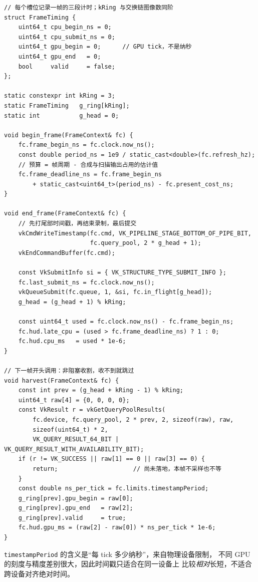 \documentclass[12pt,a4paper,fontset=fandol]{ctexbook}
\newcommand{\Tp}[1]{\texttt{#1}}
\newcommand{\Lang}[1]{\textsf{#1}}
\newcommand{\DomGPU}{\Lang{GPU}}
\begin{document}
\begin{lstlisting}[style=cppstyle,caption={主循环帧预算与 GPU 时间戳的非阻塞读回骨架},label={lst:ch01-frame-loop}]
// 每个槽位记录一帧的三段计时；kRing 与交换链图像数同阶
struct FrameTiming {
    uint64_t cpu_begin_ns = 0;
    uint64_t cpu_submit_ns = 0;
    uint64_t gpu_begin = 0;      // GPU tick，不是纳秒
    uint64_t gpu_end   = 0;
    bool     valid     = false;
};

static constexpr int kRing = 3;
static FrameTiming   g_ring[kRing];
static int           g_head = 0;

void begin_frame(FrameContext& fc) {
    fc.frame_begin_ns = fc.clock.now_ns();
    const double period_ns = 1e9 / static_cast<double>(fc.refresh_hz);
    // 预算 = 帧周期 - 合成与扫描输出占用的估计值
    fc.frame_deadline_ns = fc.frame_begin_ns
        + static_cast<uint64_t>(period_ns) - fc.present_cost_ns;
}

void end_frame(FrameContext& fc) {
    // 先打尾部时间戳，再结束录制，最后提交
    vkCmdWriteTimestamp(fc.cmd, VK_PIPELINE_STAGE_BOTTOM_OF_PIPE_BIT,
                        fc.query_pool, 2 * g_head + 1);
    vkEndCommandBuffer(fc.cmd);

    const VkSubmitInfo si = { VK_STRUCTURE_TYPE_SUBMIT_INFO };
    fc.last_submit_ns = fc.clock.now_ns();
    vkQueueSubmit(fc.queue, 1, &si, fc.in_flight[g_head]);
    g_head = (g_head + 1) % kRing;

    const uint64_t used = fc.clock.now_ns() - fc.frame_begin_ns;
    fc.hud.late_cpu = (used > fc.frame_deadline_ns) ? 1 : 0;
    fc.hud.cpu_ms   = used * 1e-6;
}

// 下一帧开头调用：非阻塞收割，收不到就跳过
void harvest(FrameContext& fc) {
    const int prev = (g_head + kRing - 1) % kRing;
    uint64_t raw[4] = {0, 0, 0, 0};
    const VkResult r = vkGetQueryPoolResults(
        fc.device, fc.query_pool, 2 * prev, 2, sizeof(raw), raw,
        sizeof(uint64_t) * 2,
        VK_QUERY_RESULT_64_BIT | VK_QUERY_RESULT_WITH_AVAILABILITY_BIT);
    if (r != VK_SUCCESS || raw[1] == 0 || raw[3] == 0) {
        return;                     // 尚未落地，本帧不采样也不等
    }
    const double ns_per_tick = fc.limits.timestampPeriod;
    g_ring[prev].gpu_begin = raw[0];
    g_ring[prev].gpu_end   = raw[2];
    g_ring[prev].valid     = true;
    fc.hud.gpu_ms = (raw[2] - raw[0]) * ns_per_tick * 1e-6;
}
\end{lstlisting}

\Tp{timestampPeriod} 的含义是``每 tick 多少纳秒''，来自物理设备限制，
不同 \DomGPU{} 的刻度与精度差别很大，因此时间戳只适合在同一设备上
比较\emph{相对}长短，不适合跨设备对齐绝对时间。
\end{document}
